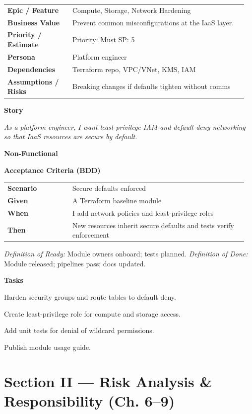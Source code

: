 \documentclass[11pt,letterpaper]{article}
\makeatletter
\newenvironment{kvtable}{%
  \par\noindent\begin{tabular}{@{}>{\raggedright\bfseries\arraybackslash}p{0.26\linewidth} >{\raggedright\arraybackslash}p{0.70\linewidth}@{}}
}{\end{tabular}\par}
\newenvironment{bdd}{%
  \par\noindent\begin{tabular}{@{}>{\raggedright\bfseries\arraybackslash}p{0.26\linewidth} >{\raggedright\arraybackslash}p{0.70\linewidth}@{}}
}{\end{tabular}\par}
\newcommand{\DoRDoD}[2]{%
  \vspace{0.35em}
  {\footnotesize\color{Muted}%
    \textit{Definition of Ready:} #1 \; \textbullet\;
    \textit{Definition of Done:} #2%
  }%
}
\newenvironment{storycard}[2]{%
  \begin{tcolorbox}[cloudcard, title={#1 --- #2}]%
}{\end{tcolorbox}}
\newcommand{\sectionlabel}[1]{\par\vspace{0.35em}\textbf{#1}\par}
\makeatother
\begin{document}
\begin{storycard}{CCS-5}{Ch. 5 — IaaS Focus}
\begin{kvtable}
Epic / Feature & Compute, Storage, Network Hardening\\
Business Value & Prevent common misconfigurations at the IaaS layer.\\
Priority / Estimate & Priority: Must \quad SP: 5\\
Persona & Platform engineer\\
Dependencies & Terraform repo, VPC/VNet, KMS, IAM\\
Assumptions / Risks & Breaking changes if defaults tighten without comms\\
\end{kvtable}
\sectionlabel{Story}
\textit{As a platform engineer, I want least-privilege IAM and default-deny networking so that IaaS resources are secure by default.}
\sectionlabel{Non-Functional}\;
\sectionlabel{Acceptance Criteria (BDD)}
\begin{bdd}
Scenario & Secure defaults enforced\\
Given & A Terraform baseline module\\
When & I add network policies and least-privilege roles\\
Then & New resources inherit secure defaults and tests verify enforcement\\
\end{bdd}
\DoRDoD{Module owners onboard; tests planned.}{Module released; pipelines pass; docs updated.}
\sectionlabel{Tasks}
\begin{checklist}
\item Harden security groups and route tables to default deny.
\item Create least-privilege role for compute and storage access.
\item Add unit tests for denial of wildcard permissions.
\item Publish module usage guide.
\end{checklist}
\end{storycard}

\section{Section II — Risk Analysis \& Responsibility (Ch. 6--9)}
\end{document}

